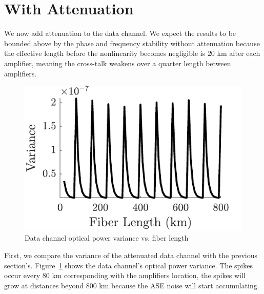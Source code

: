 \section{With Attenuation}

We now add attenuation to the data channel. We expect the results to be bounded above by the phase and frequency stability without attenuation because the effective length before the nonlinearity becomes negligible is $20$ km after each amplifier, meaning the cross-talk weakens over a quarter length between amplifiers.

%
\begin{figure}[htb]
	\centering
	\includegraphics{img/ACalcVar}
	\caption{Data channel optical power variance vs. fiber length} \label{fig:ACalcVar}
\end{figure}
%
First, we compare the variance of the attenuated data channel with the previous section's. Figure~\ref{fig:ACalcVar} shows the data channel's optical power variance. The spikes occur every $80$ km corresponding with the amplifiers location, the spikes will grow at distances beyond $800$ km because the ASE noise will start accumulating.

